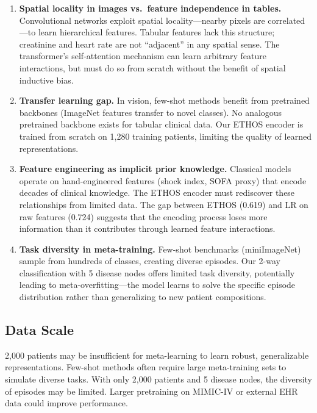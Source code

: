 \begin{enumerate}
\item \textbf{Spatial locality in images vs.\ feature independence in tables.} Convolutional networks exploit spatial locality---nearby pixels are correlated---to learn hierarchical features. Tabular features lack this structure; creatinine and heart rate are not ``adjacent'' in any spatial sense. The transformer's self-attention mechanism can learn arbitrary feature interactions, but must do so from scratch without the benefit of spatial inductive bias.

\item \textbf{Transfer learning gap.} In vision, few-shot methods benefit from pretrained backbones (ImageNet features transfer to novel classes). No analogous pretrained backbone exists for tabular clinical data. Our ETHOS encoder is trained from scratch on 1,280 training patients, limiting the quality of learned representations.

\item \textbf{Feature engineering as implicit prior knowledge.} Classical models operate on hand-engineered features (shock index, SOFA proxy) that encode decades of clinical knowledge. The ETHOS encoder must rediscover these relationships from limited data. The gap between ETHOS (0.619) and LR on raw features (0.724) suggests that the encoding process loses more information than it contributes through learned feature interactions.

\item \textbf{Task diversity in meta-training.} Few-shot benchmarks (miniImageNet) sample from hundreds of classes, creating diverse episodes. Our 2-way classification with 5 disease nodes offers limited task diversity, potentially leading to meta-overfitting---the model learns to solve the specific episode distribution rather than generalizing to new patient compositions.
\end{enumerate}

\subsection{Data Scale}

2,000 patients may be insufficient for meta-learning to learn robust, generalizable representations. Few-shot methods often require large meta-training sets to simulate diverse tasks. With only 2,000 patients and 5 disease nodes, the diversity of episodes may be limited. Larger pretraining on MIMIC-IV or external EHR data could improve performance.

